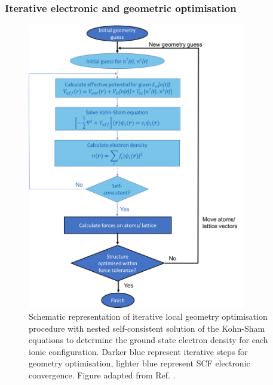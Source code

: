 \documentclass[11pt, twoside]{report}
\begin{document}





\subsubsection{Iterative electronic and geometric optimisation}
\begin{figure}[h!]
  \centering
    \includegraphics[width=0.85\textwidth]{figures/scf_flowchart.png}
    \caption{Schematic representation of iterative local geometry optimisation procedure with nested self-consistent solution of the Kohn-Sham equations to determine the ground state electron density for each ionic configuration. Darker blue represent iterative steps for geometry optimisation, lighter blue represent SCF electronic convergence. Figure adapted from Ref. .}
    \label{SCF_flowchart}
\end{figure}
\end{document}
